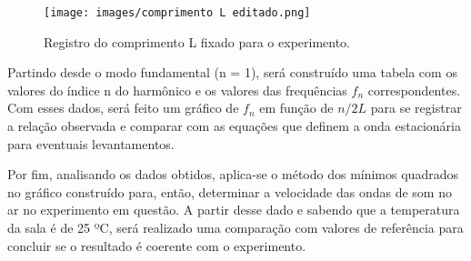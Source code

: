 \begin{figure}[H]
  \centering
  \texttt{[image: images/comprimento L editado.png]}
  \caption{Registro do comprimento L fixado para o experimento.}
\end{figure}

Partindo desde o modo fundamental (n = 1), será construído uma tabela com os valores do índice n do harmônico e os valores das frequências $f_n$ correspondentes. Com esses dados, será feito um gráfico de $f_n$ em função de $n/2L$ para se registrar a relação observada e comparar com as equações que definem a onda estacionária para eventuais levantamentos.

Por fim, analisando os dados obtidos, aplica-se o método dos mínimos quadrados no gráfico construído para, então, determinar a velocidade das ondas de som no ar no experimento em questão. A partir desse dado e sabendo que a temperatura da sala é de 25 ºC,  será realizado uma comparação com valores de referência para concluir se o resultado é coerente com o experimento.
